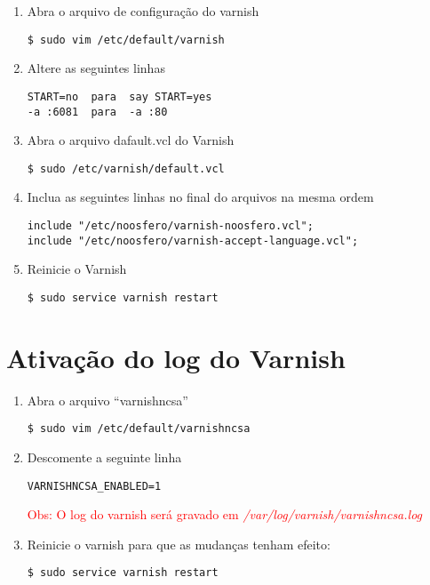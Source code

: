 \begin{enumerate}[label=\alph*)]
\item Abra o arquivo de configuração do varnish
\begin{lstlisting}
$ sudo vim /etc/default/varnish
\end{lstlisting}

\item Altere as seguintes linhas
\begin{lstlisting}
START=no  para  say START=yes
-a :6081  para  -a :80
\end{lstlisting}

\item Abra o arquivo dafault.vcl do Varnish
\begin{lstlisting}
$ sudo /etc/varnish/default.vcl
\end{lstlisting}

\item Inclua as seguintes linhas no final do arquivos na mesma ordem
\begin{lstlisting}
include "/etc/noosfero/varnish-noosfero.vcl";
include "/etc/noosfero/varnish-accept-language.vcl";
\end{lstlisting}

\item Reinicie o Varnish
\begin{lstlisting}
$ sudo service varnish restart
\end{lstlisting}

\end{enumerate}
\section{Ativação do log do Varnish}

\begin{enumerate}[label=\alph*)]
\item Abra o arquivo “varnishncsa”
\begin{lstlisting}
$ sudo vim /etc/default/varnishncsa
\end{lstlisting}

\item Descomente a seguinte linha
\begin{lstlisting}
VARNISHNCSA_ENABLED=1
\end{lstlisting}

\textcolor{red}{{\scriptsize Obs: O log do varnish será gravado em \emph{/var/log/varnish/varnishncsa.log}}}

\item Reinicie o varnish para que as mudanças tenham efeito:
\begin{lstlisting}
$ sudo service varnish restart
\end{lstlisting}
\end{enumerate}